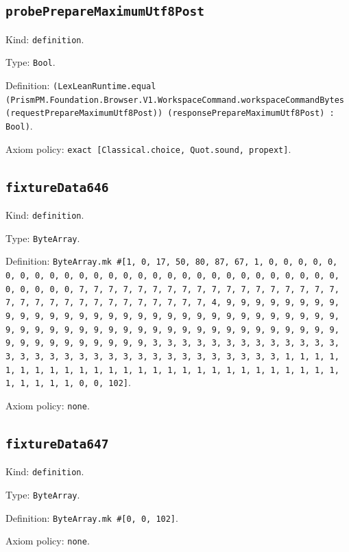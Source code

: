 \documentclass[11pt]{article}
\begin{document}
\subsection*{\texttt{probePrepareMaximumUtf8Post}}
\noindent Kind: \texttt{definition}.\par
\noindent Type: \texttt{Bool}.\par
\noindent Definition: \texttt{(LexLeanRuntime.equal (PrismPM.Foundation.Browser.V1.WorkspaceCommand.workspaceCommandBytes (requestPrepareMaximumUtf8Post)) (responsePrepareMaximumUtf8Post) : Bool)}.\par
\noindent Axiom policy: \texttt{exact [Classical.choice, Quot.sound, propext]}.\par
\subsection*{\texttt{fixtureData646}}
\noindent Kind: \texttt{definition}.\par
\noindent Type: \texttt{ByteArray}.\par
\noindent Definition: \texttt{ByteArray.mk \#[1, 0, 17, 50, 80, 87, 67, 1, 0, 0, 0, 0, 0, 0, 0, 0, 0, 0, 0, 0, 0, 0, 0, 0, 0, 0, 0, 0, 0, 0, 0, 0, 0, 0, 0, 0, 0, 0, 0, 0, 0, 7, 7, 7, 7, 7, 7, 7, 7, 7, 7, 7, 7, 7, 7, 7, 7, 7, 7, 7, 7, 7, 7, 7, 7, 7, 7, 7, 7, 7, 7, 7, 7, 4, 9, 9, 9, 9, 9, 9, 9, 9, 9, 9, 9, 9, 9, 9, 9, 9, 9, 9, 9, 9, 9, 9, 9, 9, 9, 9, 9, 9, 9, 9, 9, 9, 9, 9, 9, 9, 9, 9, 9, 9, 9, 9, 9, 9, 9, 9, 9, 9, 9, 9, 9, 9, 9, 9, 9, 9, 9, 9, 9, 9, 9, 9, 9, 9, 3, 3, 3, 3, 3, 3, 3, 3, 3, 3, 3, 3, 3, 3, 3, 3, 3, 3, 3, 3, 3, 3, 3, 3, 3, 3, 3, 3, 3, 3, 3, 3, 1, 1, 1, 1, 1, 1, 1, 1, 1, 1, 1, 1, 1, 1, 1, 1, 1, 1, 1, 1, 1, 1, 1, 1, 1, 1, 1, 1, 1, 1, 1, 1, 0, 0, 102]}.\par
\noindent Axiom policy: \texttt{none}.\par
\subsection*{\texttt{fixtureData647}}
\noindent Kind: \texttt{definition}.\par
\noindent Type: \texttt{ByteArray}.\par
\noindent Definition: \texttt{ByteArray.mk \#[0, 0, 102]}.\par
\noindent Axiom policy: \texttt{none}.\par
\end{document}
